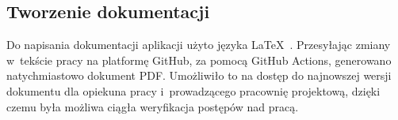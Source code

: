 \subsection{Tworzenie dokumentacji}

Do napisania dokumentacji aplikacji użyto języka \LaTeX~\cite{Latex}.
Przesyłając zmiany w~tekście pracy na platformę GitHub, za pomocą
GitHub Actions, generowano natychmiastowo dokument PDF.
Umożliwiło to na dostęp do najnowszej wersji dokumentu dla opiekuna
pracy i~prowadzącego pracownię projektową, dzięki czemu była możliwa
ciągła weryfikacja postępów nad pracą.


